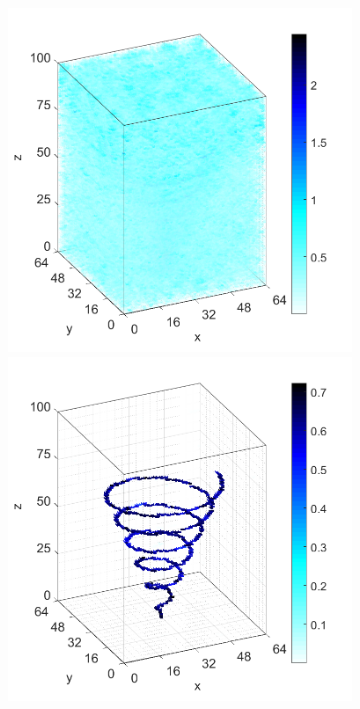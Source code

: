 \documentclass[9pt,twocolumn,twoside]{osajnl}
\begin{document}
\begin{figure}[H]
{\begin{subfigure}[b]{0.95\columnwidth}
\begin{minipage}[b]{0.13\columnwidth}
    \end{minipage}
    \includegraphics[width=0.27\columnwidth]{conhelix_complex_BP_3d}
    \includegraphics[width=0.27\columnwidth]{conhelix_complex_TwIST_3d}
    \caption{}
\end{subfigure}}


\end{figure}
\end{document}
